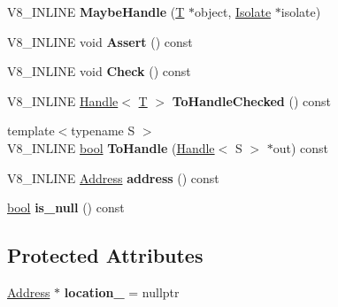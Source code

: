\begin{DoxyCompactItemize}
V8\+\_\+\+I\+N\+L\+I\+NE {\bfseries Maybe\+Handle} (\mbox{\hyperlink{classv8_1_1internal_1_1torque_1_1T}{T}} $\ast$object, \mbox{\hyperlink{classv8_1_1internal_1_1Isolate}{Isolate}} $\ast$isolate)
\item 
\mbox{\label{classv8_1_1internal_1_1MaybeHandle_ab9b2071029c6065ad1e2c1766fcdaf1a}} 
V8\+\_\+\+I\+N\+L\+I\+NE void {\bfseries Assert} () const
\item 
\mbox{\label{classv8_1_1internal_1_1MaybeHandle_afaeeb16301915dc7963e84bb1b053498}} 
V8\+\_\+\+I\+N\+L\+I\+NE void {\bfseries Check} () const
\item 
\mbox{\label{classv8_1_1internal_1_1MaybeHandle_a20a9cc0a9d9a203c12abb863ff5792fa}} 
V8\+\_\+\+I\+N\+L\+I\+NE \mbox{\hyperlink{classv8_1_1internal_1_1Handle}{Handle}}$<$ \mbox{\hyperlink{classv8_1_1internal_1_1torque_1_1T}{T}} $>$ {\bfseries To\+Handle\+Checked} () const
\item 
\mbox{\label{classv8_1_1internal_1_1MaybeHandle_a3b5231fab67972a216796d0a596ab003}} 
{\footnotesize template$<$typename S $>$ }\\V8\+\_\+\+I\+N\+L\+I\+NE \mbox{\hyperlink{classbool}{bool}} {\bfseries To\+Handle} (\mbox{\hyperlink{classv8_1_1internal_1_1Handle}{Handle}}$<$ S $>$ $\ast$out) const
\item 
\mbox{\label{classv8_1_1internal_1_1MaybeHandle_adc1b32f0905bf78ce86b2b050575b07d}} 
V8\+\_\+\+I\+N\+L\+I\+NE \mbox{\hyperlink{classuintptr__t}{Address}} {\bfseries address} () const
\item 
\mbox{\label{classv8_1_1internal_1_1MaybeHandle_a76d0200bf11d6f7628c7119d730efa44}} 
\mbox{\hyperlink{classbool}{bool}} {\bfseries is\+\_\+null} () const
\end{DoxyCompactItemize}
\subsection*{Protected Attributes}
\begin{DoxyCompactItemize}
\item 
\mbox{\label{classv8_1_1internal_1_1MaybeHandle_a6d515c6370181fe91cc93c8952c5e357}} 
\mbox{\hyperlink{classuintptr__t}{Address}} $\ast$ {\bfseries location\+\_\+} = nullptr
\end{DoxyCompactItemize}
